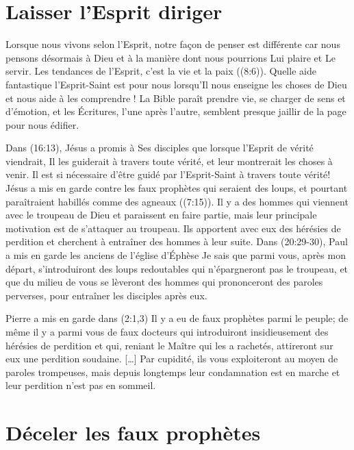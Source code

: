 \section{Laisser l'Esprit diriger}

Lorsque nous vivons selon l'Esprit, notre façon de penser est différente
 car nous pensons désormais à Dieu et à la manière dont nous pourrions
 Lui plaire et Le servir.
 Les tendances de l'Esprit, c'est la vie et la paix ((8:6)).
 Quelle aide fantastique l'Esprit-Saint est pour nous lorsqu'Il nous enseigne
 les choses de Dieu et nous aide à les comprendre !
 La Bible paraît prendre vie, se charger de sens et d'émotion,
 et les Écritures, l'une après l'autre, semblent presque jaillir
 de la page pour nous édifier.

Dans (16:13), Jésus a promis à Ses disciples
 que lorsque l'Esprit de vérité viendrait,
 Il les guiderait à travers toute vérité,
 et leur montrerait les choses à venir.
 Il est si nécessaire d'être guidé par l'Esprit-Saint
 à travers toute vérité!
 Jésus a mis en garde contre les faux prophètes qui seraient des loups,
 et pourtant paraîtraient habillés comme des agneaux ((7:15)).
 Il y a des hommes qui viennent avec le troupeau de Dieu
 et paraissent en faire partie, mais leur principale motivation
 est de s'attaquer au troupeau.
 Ils apportent avec eux des hérésies de perdition
 et cherchent à entraîner des hommes à leur suite.
 Dans (20:29-30),
 Paul a mis en garde les anciens de l'église d'Éphèse\frcolon{}
 \Og Je sais que parmi vous, après mon départ,
 s'introduiront des loups redoutables
 qui n'épargneront pas le troupeau,
 et que du milieu de vous se lèveront des hommes
 qui prononceront des paroles perverses,
 pour entraîner les disciples après eux. \Fg{}

Pierre a mis en garde dans (2:1,3)\frcolon{}
 \Og Il y a eu de faux prophètes parmi le peuple;
 de même il y a parmi vous de faux docteurs
 qui introduiront insidieusement des hérésies de perdition et qui,
 reniant le Maître qui les a rachetés,
 attireront sur eux une perdition soudaine. [\dots{}]
 Par cupidité, ils vous exploiteront au moyen de paroles trompeuses,
 mais depuis longtemps leur condamnation est en marche
 et leur perdition n'est pas en sommeil. \Fg{}


\section{D\'eceler les faux proph\`etes}


